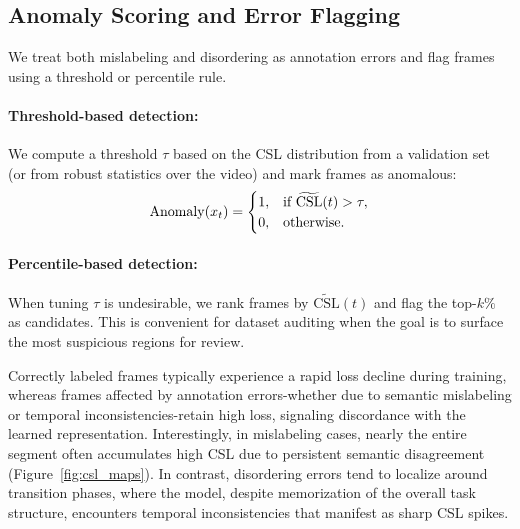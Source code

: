 \documentclass{article}
\theoremstyle{plain}
\theoremstyle{definition}
\theoremstyle{remark}
\begin{document}
\vspace{-0.4em}
\subsection{Anomaly Scoring and Error Flagging}
We treat both mislabeling and disordering as annotation errors and flag frames using a threshold or percentile rule.

\vspace{-0.4em}
\paragraph{Threshold-based detection:}
We compute a threshold $\tau$ based on the CSL distribution from a validation set (or from robust statistics over the video) and mark frames as anomalous:
\vspace{-0.4em}
\begin{equation}
\mathrm{Anomaly}(x_t)=
\begin{cases}
1, & \text{if } \widetilde{\mathrm{CSL}}(t) > \tau, \\
0, & \text{otherwise.}
\end{cases}
\vspace{-0.8em}
\end{equation}

\vspace{-0.4em}
\paragraph{Percentile-based detection:}
When tuning $\tau$ is undesirable, we rank frames by $\widetilde{\mathrm{CSL}}(t)$ and flag the top-$k\%$ as candidates. This is convenient for dataset auditing when the goal is to surface the most suspicious regions for review.

Correctly labeled frames typically experience a rapid loss decline during training, whereas frames affected by annotation errors-whether due to semantic mislabeling or temporal inconsistencies-retain high loss, signaling discordance with the learned representation. Interestingly, in mislabeling cases, nearly the entire segment often accumulates high CSL due to persistent semantic disagreement (Figure~\ref{fig:csl_maps}). In contrast, disordering errors tend to localize around transition phases, where the model, despite memorization of the overall task structure, encounters temporal inconsistencies that manifest as sharp CSL spikes.

\vspace{-0.4em}
\end{document}
